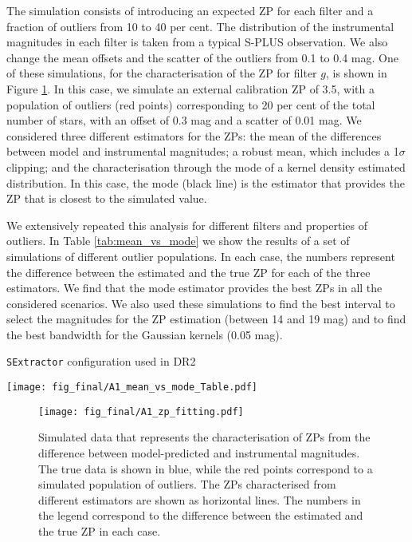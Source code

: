 \documentclass[fleqn,usenatbib]{mnras}
\begin{document}
The simulation consists of introducing an expected ZP for each filter and a fraction of outliers from 10 to 40 per cent. The distribution of the instrumental magnitudes in each filter is taken from a typical S-PLUS observation. We also change the mean offsets and the scatter of the outliers from 0.1 to 0.4 mag. One of these simulations, for the characterisation of the ZP for filter $g$, is shown in Figure \ref{fig:sim_zp_fitting_ex}. In this case, we simulate an external calibration ZP of 3.5, with a population of outliers (red points) corresponding to 20 per cent of the total number of stars, with an offset of 0.3 mag and a scatter of 0.01 mag. We considered three different estimators for the ZPs: the mean of the differences between model and instrumental magnitudes; a robust mean, which includes a 1$\sigma$ clipping; and the characterisation through the mode of a kernel density estimated distribution. In this case, the mode (black line) is the estimator that provides the ZP that is closest to the simulated value.

We extensively repeated this analysis for different filters and properties of outliers. In Table \ref{tab:mean_vs_mode} we show the results of a set of simulations of different outlier populations. In each case, the numbers represent the difference between the estimated and the true ZP for each of the three estimators. We find that the mode estimator provides the best ZPs in all the considered scenarios. We also used these simulations to find the best interval to select the magnitudes for the ZP estimation (between 14 and 19 mag) and to find the best bandwidth for the Gaussian kernels (0.05 mag).

\begin{table}
\caption{\texttt{SExtractor} configuration used in DR2}
\centering
\label{tab:mean_vs_mode}
\texttt{[image: fig\_final/A1\_mean\_vs\_mode\_Table.pdf]}
\end{table}

\begin{figure}
\begin{center}
\texttt{[image: fig\_final/A1\_zp\_fitting.pdf]}
\caption{\label{fig:sim_zp_fitting_ex} Simulated data that represents the characterisation of ZPs from the difference between model-predicted and instrumental magnitudes. The true data is shown in blue, while the red points correspond to a simulated population of outliers. The ZPs characterised from different estimators are shown as horizontal lines. The numbers in the legend correspond to the difference between the estimated and the true ZP in each case.}
\end{center}
\end{figure}
\end{document}
